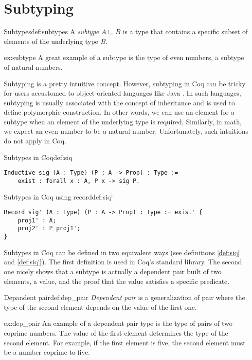 \section{Subtyping}
\begin{defi}{Subtypes}{def:subtypes}
A \emph{subtype} $A \sqsubseteq B$ is a type that contains a specific subset of elements of the underlying type $B$.
\end{defi}
\begin{example}{}{ex:subtype}
A great example of a subtype is the type of even numbers, a subtype of natural numbers.
\end{example}
Subtyping is a pretty intuitive concept. However, subtyping in Coq can be tricky for users accustomed to object-oriented languages like Java \cite{Java}. In such languages, subtyping is usually associated with the concept of inheritance and is used to define polymorphic construction. In other words, we can use an element for a subtype when an element of the underlying type is required. Similarly, in math, we expect an even number to be a natural number. Unfortunately, such intuitions do not apply in Coq.
\begin{defi}{Subtypes in Coq}{def:siq}
\begin{verbatim}
Inductive sig (A : Type) (P : A -> Prop) : Type :=
    exist : forall x : A, P x -> sig P.
\end{verbatim}
\end{defi}
\begin{defi}{Subtypes in Coq using record}{def:siq'}
\begin{verbatim}
Record sig' (A : Type) (P : A -> Prop) : Type := exist' {
    proj1' : A;
    proj2' : P proj1';
}
\end{verbatim}
\end{defi}
Subtypes in Coq can be defined in two equivalent ways (see definitions \ref{def:siq} and \ref{def:siq'}). The first definition is used in Coq's standard library. The second one nicely shows that a subtype is actually a dependent pair built of two elements, a value, and  the proof that the value satisfies a specific predicate.
\begin{defi}{Depandent pair}{def:dep_pair}
\emph{Dependent pair} is a generalization of pair where the type of the second element depends on the value of the first one.
\end{defi}
\begin{example}{}{ex:dep_pair}
An example of a dependent pair type is the type of pairs of two coprime numbers. The value of the first element determines the type of the second element. For example, if the first element is five, the second element must be a number coprime to five.
\end{example}
